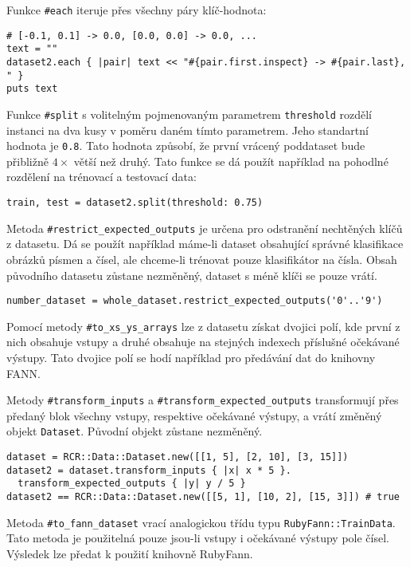 \documentclass[a4paper]{article}
\begin{document}
Funkce \texttt{\#each} iteruje přes všechny páry klíč-hodnota:
\begin{lstlisting}
# [-0.1, 0.1] -> 0.0, [0.0, 0.0] -> 0.0, ...
text = ""
dataset2.each { |pair| text << "#{pair.first.inspect} -> #{pair.last}, " }
puts text
\end{lstlisting}

Funkce \texttt{\#split} s volitelným pojmenovaným parametrem \texttt{threshold}
rozdělí instanci na dva kusy v poměru daném tímto parametrem. Jeho standartní
hodnota je \texttt{0.8}. Tato hodnota způsobí, že první vrácený poddataset bude
přibližně $4\times$ větší než druhý.
Tato funkce se dá použít například na pohodlné rozdělení na trénovací a
testovací data:
\begin{lstlisting}
train, test = dataset2.split(threshold: 0.75)
\end{lstlisting}

Metoda \texttt{\#restrict\_expected\_outputs} je určena pro odstranění nechtěných klíčů
z datasetu. Dá se použít například máme-li dataset obsahující správné klasifikace
obrázků písmen a čísel, ale chceme-li trénovat pouze klasifikátor na čísla.
Obsah původního datasetu zůstane nezměněný, dataset s méně klíči se pouze vrátí.
\begin{lstlisting}
number_dataset = whole_dataset.restrict_expected_outputs('0'..'9')
\end{lstlisting}

Pomocí metody \texttt{\#to\_xs\_ys\_arrays} lze z datasetu získat dvojici polí,
kde první z nich obsahuje vstupy a druhé obsahuje na stejných indexech příslušné
očekávané výstupy. Tato dvojice polí se hodí například pro předávání dat do
knihovny FANN.

Metody \texttt{\#transform\_inputs} a \texttt{\#transform\_expected\_outputs} transformují
přes předaný blok všechny vstupy, respektive očekávané výstupy, a vrátí změněný
objekt \texttt{Dataset}. Původní objekt zůstane nezměněný.
\begin{lstlisting}
dataset = RCR::Data::Dataset.new([[1, 5], [2, 10], [3, 15]])
dataset2 = dataset.transform_inputs { |x| x * 5 }.
  transform_expected_outputs { |y| y / 5 }
dataset2 == RCR::Data::Dataset.new([[5, 1], [10, 2], [15, 3]]) # true
\end{lstlisting}

Metoda \texttt{\#to\_fann\_dataset} vrací analogickou třídu typu
\texttt{RubyFann::TrainData}. Tato metoda je použitelná pouze jsou-li vstupy i
očekávané výstupy pole čísel. Výsledek lze předat k použití knihovně RubyFann.
\end{document}

